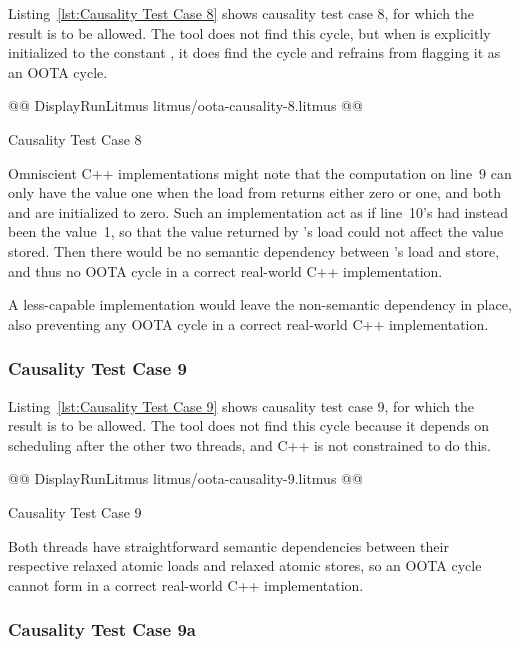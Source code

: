 \documentclass[10]{article}
\begin{document}
Listing~\ref{lst:Causality Test Case 8}
shows causality test case 8, for which the 
result is to be allowed.
The  tool does not find this cycle, but when  is explicitly
initialized to the constant , it does find the cycle and refrains
from flagging it as an OOTA cycle.

\begin{listing}[tbp]
@@ DisplayRunLitmus litmus/oota-causality-8.litmus @@
\caption{Causality Test Case 8}
\label{lst:Causality Test Case 8}
\end{listing}

Omniscient C++ implementations might note that the computation on line~9
can only have the value one when the load from  returns either
zero or one, and both  and  are initialized to zero.
Such an implementation act as if line~10's  had instead been
the value~1, so that the value returned by 's load could not
affect the value stored.
Then there would be no semantic dependency between 's load
and store, and thus no OOTA cycle in a correct real-world C++
implementation.

A less-capable implementation would leave the non-semantic dependency
in place, also preventing any OOTA cycle in a correct real-world C++
implementation.

\subsubsection{Causality Test Case 9}
\label{app:Causality Test Case 9}

Listing~\ref{lst:Causality Test Case 9}
shows causality test case 9, for which the 
result is to be allowed.
The  tool does not find this cycle because it depends on
scheduling  after the other two threads, and C++ is not
constrained to do this.

\begin{listing}[tbp]
@@ DisplayRunLitmus litmus/oota-causality-9.litmus @@
\caption{Causality Test Case 9}
\label{lst:Causality Test Case 9}
\end{listing}

Both threads have straightforward semantic dependencies between their
respective relaxed atomic loads and relaxed atomic stores, so an OOTA
cycle cannot form in a correct real-world C++ implementation.

\subsubsection{Causality Test Case 9a}
\label{app:Causality Test Case 9a}
\end{document}
